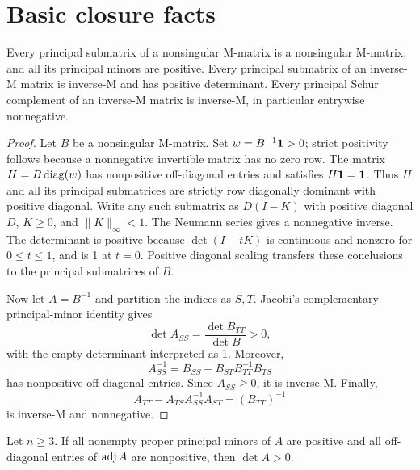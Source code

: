 \section{Basic closure facts}
\begin{lemma}\label{lem:closure}
Every principal submatrix of a nonsingular M-matrix is a nonsingular M-matrix, and all its principal minors are positive. Every principal submatrix of an inverse-M matrix is inverse-M and has positive determinant. Every principal Schur complement of an inverse-M matrix is inverse-M, in particular entrywise nonnegative.
\end{lemma}
\begin{proof}
Let $B$ be a nonsingular M-matrix. Set $w=B^{-1}\mathbf 1>0$; strict positivity follows because a nonnegative invertible matrix has no zero row. The matrix $H=B\operatorname{diag}(w)$ has nonpositive off-diagonal entries and satisfies $H\mathbf 1=\mathbf 1$. Thus $H$ and all its principal submatrices are strictly row diagonally dominant with positive diagonal. Write any such submatrix as $D(I-K)$ with positive diagonal $D$, $K\ge0$, and $\|K\|_\infty<1$. The Neumann series gives a nonnegative inverse. The determinant is positive because $\det(I-tK)$ is continuous and nonzero for $0\le t\le1$, and is 1 at $t=0$. Positive diagonal scaling transfers these conclusions to the principal submatrices of $B$.

Now let $A=B^{-1}$ and partition the indices as $S,T$. Jacobi's complementary principal-minor identity gives
\[
 \det A_{SS}=\frac{\det B_{TT}}{\det B}>0,
\]
with the empty determinant interpreted as 1. Moreover,
\[
 A_{SS}^{-1}=B_{SS}-B_{ST}B_{TT}^{-1}B_{TS}
\]
has nonpositive off-diagonal entries. Since $A_{SS}\ge0$, it is inverse-M. Finally,
\[
 A_{TT}-A_{TS}A_{SS}^{-1}A_{ST}=(B_{TT})^{-1}
\]
is inverse-M and nonnegative.
\end{proof}
\begin{lemma}\label{lem:adj}
Let $n\ge3$. If all nonempty proper principal minors of $A$ are positive and all off-diagonal entries of $\operatorname{adj} A$ are nonpositive, then $\det A>0$.
\end{lemma}

